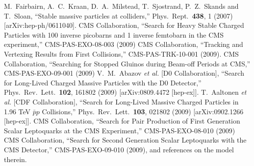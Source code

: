 \documentclass{PoS}
\begin{document}
\begin{thebibliography}{0}
  M.~Fairbairn, A.~C.~Kraan, D.~A.~Milstead, T.~Sjostrand, P.~Z.~Skands and T.~Sloan,
  ``Stable massive particles at colliders,''
  Phys.\ Rept.\  {\bf 438}, 1 (2007)
  [arXiv:hep-ph/0611040].
 CMS Collaboration,
 ``Search for Heavy Stable Charged Particles with 100 inverse picobarns and 1 inverse femtobarn in the CMS experiment,''
 CMS-PAS-EXO-08-003 (2009)
 CMS Collaboration,
 ``Tracking and Vertexing Results from First Collisions,''
 CMS-PAS-TRK-10-001 (2009).
  CMS Collaboration,
  ``Searching for Stopped Gluinos during Beam-off Periods at CMS,''
  CMS-PAS-EXO-09-001 (2009)
  V.~M.~Abazov {\it et al.}  [D0 Collaboration],
  ``Search for Long-Lived Charged Massive Particles with the D0 Detector,''
  Phys.\ Rev.\ Lett.\  {\bf 102}, 161802 (2009)
  [arXiv:0809.4472 [hep-ex]].
\quad
  T.~Aaltonen {\it et al.}  [CDF Collaboration],
  ``Search for Long-Lived Massive Charged Particles in 1.96 TeV $\bar{p}p$ Collisions,''
  Phys.\ Rev.\ Lett.\  {\bf 103}, 021802 (2009)
  [arXiv:0902.1266 [hep-ex]].
  CMS Collaboration,
  ``Search for Pair Production of First Generation Scalar Leptoquarks at the CMS Experiment,''
  CMS-PAS-EXO-08-010 (2009)
\quad 
  CMS Collaboration,
  ``Search for Second Generation Scalar Leptoquarks with the CMS Detector,''
  CMS-PAS-EXO-09-010 (2009), and references on the model therein.
\end{thebibliography}
\end{document}
